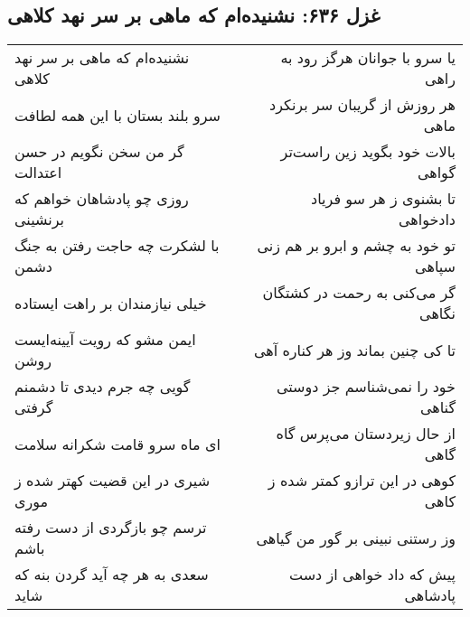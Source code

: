 \begin{center}
\section*{غزل ۶۳۶: نشنیده‌ام که ماهی بر سر نهد کلاهی}
\label{sec:636}
\begin{longtable}{l p{0.5cm} r}
نشنیده‌ام که ماهی بر سر نهد کلاهی
&&
یا سرو با جوانان هرگز رود به راهی
\\
سرو بلند بستان با این همه لطافت
&&
هر روزش از گریبان سر برنکرد ماهی
\\
گر من سخن نگویم در حسن اعتدالت
&&
بالات خود بگوید زین راست‌تر گواهی
\\
روزی چو پادشاهان خواهم که برنشینی
&&
تا بشنوی ز هر سو فریاد دادخواهی
\\
با لشکرت چه حاجت رفتن به جنگ دشمن
&&
تو خود به چشم و ابرو بر هم زنی سپاهی
\\
خیلی نیازمندان بر راهت ایستاده
&&
گر می‌کنی به رحمت در کشتگان نگاهی
\\
ایمن مشو که رویت آیینه‌ایست روشن
&&
تا کی چنین بماند وز هر کناره آهی
\\
گویی چه جرم دیدی تا دشمنم گرفتی
&&
خود را نمی‌شناسم جز دوستی گناهی
\\
ای ماه سرو قامت شکرانه سلامت
&&
از حال زیردستان می‌پرس گاه گاهی
\\
شیری در این قضیت کهتر شده ز موری
&&
کوهی در این ترازو کمتر شده ز کاهی
\\
ترسم چو بازگردی از دست رفته باشم
&&
وز رستنی نبینی بر گور من گیاهی
\\
سعدی به هر چه آید گردن بنه که شاید
&&
پیش که داد خواهی از دست پادشاهی
\\
\end{longtable}
\end{center}
